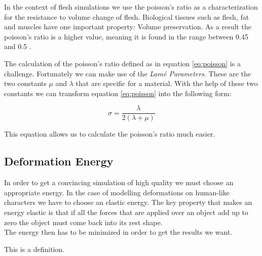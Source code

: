 In the context of flesh simulations we use the poisson's ratio as a characterization for the resistance to volume change of flesh. Biological tissues such as flesh, fat and muscles have one important property: Volume preservation. As a result the poisson's ratio is a higher value, meaning it is found in the range between 0.45 and 0.5 \cite{Smith:2018:SNF:3191713.3180491}.

The calculation of the poisson's ratio defined as in equation \ref{eq:poisson} is a challenge. Fortunately we can make use of the \textit{Lamé Parameters}. These are the two constants $\mu$ and $\lambda$ that are specific for a material. With the help of these two constants we can transform equation \ref{eq:poisson} into the following form:

\begin{equation}\label{eq:poisson_ratio}
\sigma =  \frac{\lambda}{2(\lambda + \mu)}
\end{equation}

This equation allows us to calculate the poisson's ratio much easier. 




\subsection{Deformation Energy}
In order to get a convincing simulation of high quality we must choose an appropriate energy. In the case of modelling deformations on human-like characters we have to choose an elastic energy. The key property that makes an energy elastic is that if all the forces that are applied over an object add up to zero the object must come back into its rest shape.
\\
The energy then has to be minimized in order to get the results we want.

\begin{definition}
  This is a definition.
\end{definition}







